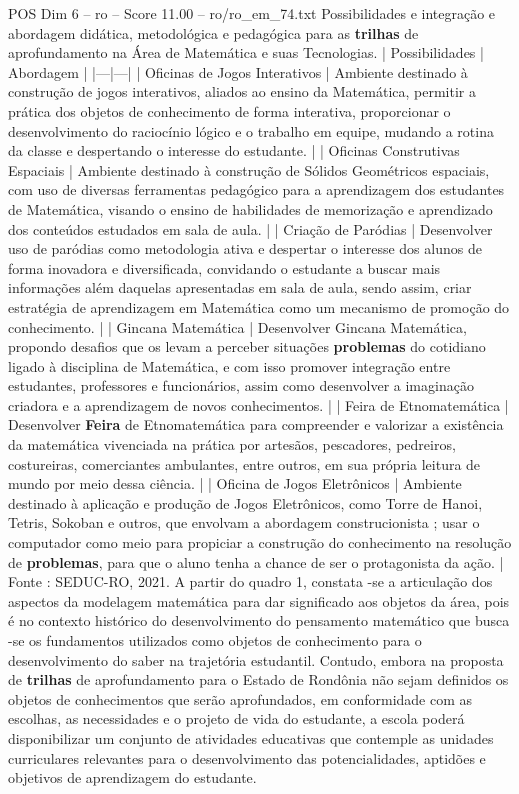 \begin{textsample}{POS Dim 6 – ro – Score 11.00 – ro/ro\_em\_74.txt}
Possibilidades e integração e abordagem didática, metodológica e pedagógica para as \textbf{trilhas} de aprofundamento na Área de Matemática e suas Tecnologias. | Possibilidades | Abordagem | |---|---| | Oficinas de Jogos Interativos | Ambiente destinado à construção de jogos interativos, aliados ao ensino da Matemática, permitir a prática dos objetos de conhecimento de forma interativa, proporcionar o desenvolvimento do raciocínio lógico e o trabalho em equipe, mudando a rotina da classe e despertando o interesse do estudante. | | Oficinas Construtivas Espaciais | Ambiente destinado à construção de Sólidos Geométricos espaciais, com uso de diversas ferramentas pedagógico para a aprendizagem dos estudantes de Matemática, visando o ensino de habilidades de memorização e aprendizado dos conteúdos estudados em sala de aula. | | Criação de Paródias | Desenvolver uso de paródias como metodologia ativa e despertar o interesse dos alunos de forma inovadora e diversificada, convidando o estudante a buscar mais informações além daquelas apresentadas em sala de aula, sendo assim, criar estratégia de aprendizagem em Matemática como um mecanismo de promoção do conhecimento. | | Gincana Matemática | Desenvolver Gincana Matemática, propondo desafios que os levam a perceber situações \textbf{problemas} do cotidiano ligado à disciplina de Matemática, e com isso promover integração entre estudantes, professores e funcionários, assim como desenvolver a imaginação criadora e a aprendizagem de novos conhecimentos. | | Feira de Etnomatemática | Desenvolver \textbf{Feira} de Etnomatemática para compreender e valorizar a existência da matemática vivenciada na prática por artesãos, pescadores, pedreiros, costureiras, comerciantes ambulantes, entre outros, em sua própria leitura de mundo por meio dessa ciência. | | Oficina de Jogos Eletrônicos | Ambiente destinado à aplicação e produção de Jogos Eletrônicos, como Torre de Hanoi, Tetris, Sokoban e outros, que envolvam a abordagem construcionista ; usar o computador como meio para propiciar a construção do conhecimento na resolução de \textbf{problemas}, para que o aluno tenha a chance de ser o protagonista da ação. | Fonte : SEDUC-RO, 2021.
A partir do quadro 1, constata -se a articulação dos aspectos da modelagem matemática para dar significado aos objetos da área, pois é no contexto histórico do desenvolvimento do pensamento matemático que busca -se os fundamentos utilizados como objetos de conhecimento para o desenvolvimento do saber na trajetória estudantil.
Contudo, embora na proposta de \textbf{trilhas} de aprofundamento para o Estado de Rondônia não sejam definidos os objetos de conhecimentos que serão aprofundados, em conformidade com as escolhas, as necessidades e o projeto de vida do estudante, a escola poderá disponibilizar um conjunto de atividades educativas que contemple as unidades curriculares relevantes para o desenvolvimento das potencialidades, aptidões e objetivos de aprendizagem do estudante.

\end{textsample}
